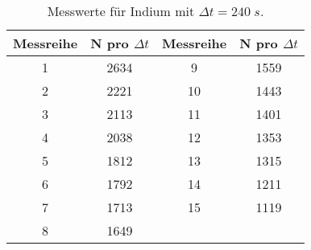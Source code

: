 \begin{table}[H]
  \centering
  \caption{Messwerte für Indium mit $\Delta t=240\;s $.}
  \label{tab:tab2}
    \begin{tabular}{c c c c}
    \toprule
    Messreihe & N pro $\Delta t$ & Messreihe & N pro $\Delta t$ \\
    \midrule
    1 & 2634 & 9 & 1559\\
    2 & 2221 & 10 & 1443\\
    3 & 2113 & 11 & 1401\\
    4 & 2038 & 12 & 1353\\
    5 & 1812 & 13 &1315\\
    6 & 1792 & 14& 1211\\
    7 & 1713 & 15 &1119\\
    8 & 1649 & &\\
    \bottomrule
    \end{tabular}
  \end{table}
